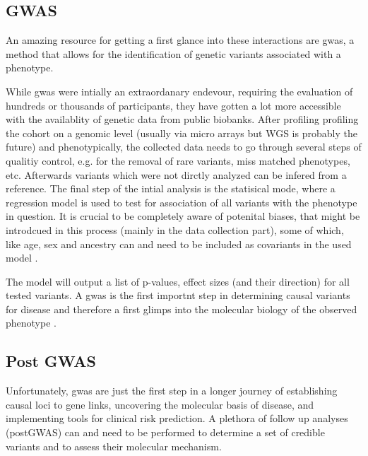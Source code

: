     \subsection{GWAS}
    \label{subsec:gwas_general}
    An amazing resource for getting a first glance into these interactions are \ac{gwas}, a method that allows for the identification of genetic variants associated with a phenotype.

    While \ac{gwas} were intially an extraordanary endevour, requiring the evaluation of hundreds or thousands of participants, they have gotten a lot more accessible with the availablity of genetic data from public biobanks. After profiling profiling the cohort on a genomic level (usually via micro arrays but WGS is probably the future) and phenotypically, the collected data needs to go through several steps of qualitiy control, e.g. for the removal of rare variants, miss matched phenotypes, etc. Afterwards variants which were not dirctly analyzed can be infered from a reference. The final step of the intial analysis is the statisical mode, where a regression model is used to test for association of all variants with the phenotype in question. It is crucial to be completely aware of potenital biases, that might be introdcued in this process (mainly in the data collection part), some of which, like  age, sex and ancestry can and need to be included as covariants in the used model \cite{uffelmannGenomewideAssociationStudies2021, flintGWAS2013}.

    The model will output a list of p-values, effect sizes (and their direction) for all tested variants. A \ac{gwas} is the first importnt step in determining causal variants for disease and therefore a first glimps into the molecular biology of the observed phenotype \cite{uffelmannGenomewideAssociationStudies2021}.

    \subsection{Post GWAS}
    \label{subsec:gwas_limit}
    Unfortunately, \ac{gwas} are just the first step in a longer journey of establishing causal loci to gene links, uncovering the molecular basis of disease, and implementing tools for clinical risk prediction. A plethora of follow up analyses (postGWAS) can and need to be performed to determine a set of credible variants and to assess their molecular mechanism.

